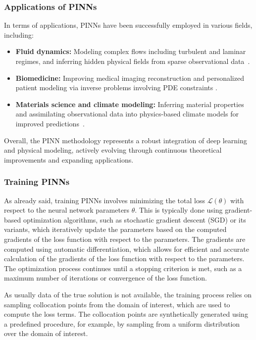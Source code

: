 \documentclass[12pt]{report} %
\theoremstyle{plain}           %
\theoremstyle{definition}      %
\theoremstyle{remark}          %
\begin{document}
\subsubsection{Applications of PINNs}
In terms of applications, PINNs have been successfully employed in various fields, including:
\begin{itemize}
    \item \textbf{Fluid dynamics:} Modeling complex flows including turbulent and laminar regimes, 
	and inferring hidden physical fields from sparse observational 
	data~\cite{RAISSI2019686, bhatnagar2019prediction}.
    
    \item \textbf{Biomedicine:} Improving medical imaging reconstruction and personalized patient 
	modeling via inverse problems involving PDE constraints \cite{banerjee2024pinnsmedicalimageanalysis}.
    
    \item \textbf{Materials science and climate modeling:} Inferring material properties and 
	assimilating observational data into physics-based climate models for improved 
	predictions~\cite{karniadakis2021physics}.
\end{itemize}
Overall, the PINN methodology represents a robust integration of deep learning and physical 
modeling, actively evolving through continuous theoretical improvements and expanding applications.

\subsubsection{Training PINNs}
As already said, training PINNs involves minimizing the total loss $\mathcal{L}(\theta)$ with respect to the
neural network parameters $\theta$. This is typically done using gradient-based optimization algorithms,
such as stochastic gradient descent (SGD) or its variants, which iteratively update the parameters
based on the computed gradients of the loss function with respect to the parameters. The gradients are
computed using automatic differentiation, which allows for efficient and accurate calculation of the gradients
of the loss function with respect to the parameters. The optimization process continues until a stopping criterion is met,
such as a maximum number of iterations or convergence of the loss function.

As usually data of the true solution is not available, the training process relies on sampling collocation points
from the domain of interest, which are used to compute the loss terms. The collocation points are synthetically generated
using a predefined procedure, for example, by sampling from a uniform distribution over the domain of interest.
\end{document}
